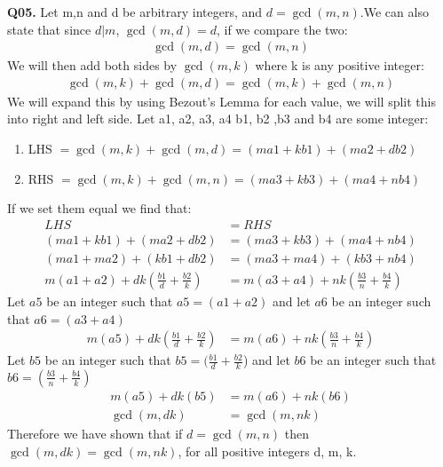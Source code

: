 \documentclass[11pt]{article}
\begin{document}
\textbf{Q05.} Let m,n and d be arbitrary integers, and $d=\gcd(m,n)$.We can also state that since $d|m$, $\gcd(m,d) = d$, if we compare the two:
\begin{align*}
\gcd(m,d) = \gcd(m,n)
\end{align*}
We will then add both sides by $\gcd(m,k)$ where k is any positive integer:
\begin{align*}
\gcd(m,k)+\gcd(m,d) = \gcd(m,k)+\gcd(m,n)
\end{align*}
We will expand this by using Bezout's Lemma for each value, we will split this into right and left side. Let a1, a2, a3, a4 b1, b2 ,b3 and b4 are some integer:
\begin{enumerate}
\item LHS $= \gcd(m,k)+ \gcd(m,d) = (ma1 + kb1) + (ma2 + db2)$
\item RHS $= \gcd(m,k)+ \gcd(m,n) = (ma3 + kb3) + (ma4 + nb4)$
\end{enumerate}
If we set them equal we find that:
\begin{align*}
LHS & = RHS\\
(ma1 + kb1) + (ma2 + db2) & = (ma3 + kb3) + (ma4 + nb4)\\
(ma1 + ma2) + (kb1 + db2) & = (ma3 + ma4) + (kb3 + nb4)\\
m(a1+a2) + dk(\frac{b1}{d} + \frac{b2}{k}) & = m(a3+a4) + nk(\frac{b3}{n} + \frac{b4}{k})
\end{align*}
Let $a5$ be an integer such that $a5 = (a1+a2)$ and let $a6$ be an integer such that $a6 = (a3+a4)$
\begin{align*}
m(a5) + dk(\frac{b1}{d} + \frac{b2}{k}) & = m(a6) + nk(\frac{b3}{n} + \frac{b4}{k})
\end{align*}
Let $b5$ be an integer such that $b5 = (\frac{b1}{d} + \frac{b2}{k}$) and let $b6$ be an integer such that $b6 = (\frac{b3}{n} + \frac{b4}{k})$
\begin{align*}
m(a5) + dk(b5) & = m(a6) + nk(b6)\\
\gcd(m, dk)  & = \gcd(m, nk) 
\end{align*}
Therefore we have shown that if $d=\gcd(m,n)$ then $\gcd(m, dk) = \gcd(m, nk)$, for all positive integers d, m, k.
\end{document}
